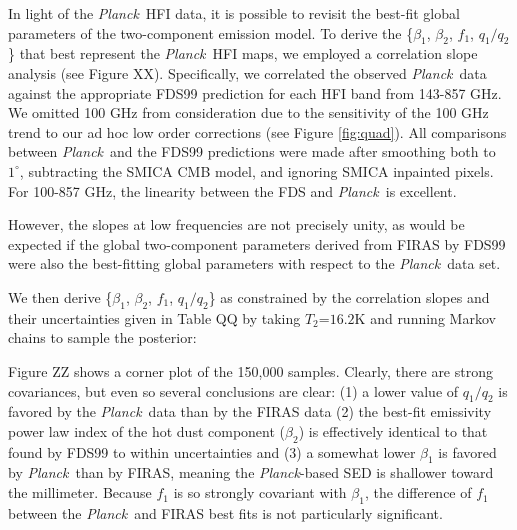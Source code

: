 \documentclass{emulateapj}
\newcommand{\PLANCK}{{\it Planck}}
\begin{document}

In light of the \PLANCK~HFI data, it is possible to revisit the best-fit global
parameters of the two-component emission model. To derive the 
\{$\beta_1$, $\beta_2$, $f_1$, $q_1/q_2$\} that best represent the \PLANCK~HFI
maps, we employed a correlation slope analysis (see Figure XX). Specifically,
we correlated the observed \PLANCK~data against the appropriate FDS99 
prediction for each HFI band from 143-857 GHz. We omitted 100 GHz from 
consideration due to the sensitivity of the 100 GHz trend to our ad hoc
low order corrections (see Figure \ref{fig:quad}). All comparisons between
\PLANCK~and the FDS99 predictions were made after smoothing both to 
$1^{\circ}$, subtracting the SMICA CMB model, and ignoring SMICA inpainted 
pixels. For 100-857 GHz, the linearity between the FDS and \PLANCK~is
excellent.


However, the slopes at low frequencies are not precisely unity, as would
be expected if the global two-component parameters derived from FIRAS by
FDS99 were also the best-fitting global parameters with respect to the 
\PLANCK~data set.


We then derive \{$\beta_1$, $\beta_2$, $f_1$, $q_1/q_2$\} as constrained by 
the correlation slopes and their uncertainties given in Table QQ by 
taking $T_2$=$16.2$K and running Markov chains to sample the posterior:

Figure ZZ shows a corner plot of the 150,000 samples. Clearly, there are
strong covariances, but even so several conclusions are clear: (1) a lower 
value of $q_1/q_2$ is favored by the \PLANCK~data than by the FIRAS data (2) 
the best-fit emissivity power law index of the hot dust component ($\beta_2$) 
is effectively identical to that found by FDS99 to within uncertainties and (3)
a somewhat lower $\beta_1$ is favored by \PLANCK~than by FIRAS, meaning the
\PLANCK-based SED is shallower toward the millimeter. Because $f_1$ is so 
strongly covariant with $\beta_1$, the difference of $f_1$ between the 
\PLANCK~and FIRAS best fits is not particularly significant.

\end{document}
